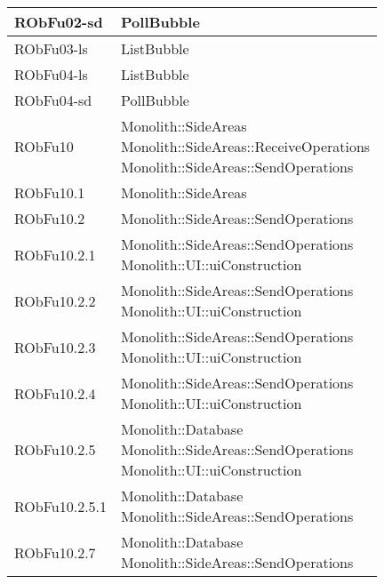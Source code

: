 \begin{center}
\begin{longtable}{|
*{1}{>{\centering\arraybackslash}m{2.5cm}|}
*{1}{>{\centering\arraybackslash}m{7.5cm}|}}
RObFu02-sd & \makecell[l]{PollBubble
\\}\\\hline
RObFu03-ls & \makecell[l]{ListBubble
\\}\\\hline
RObFu04-ls & \makecell[l]{ListBubble
\\}\\\hline
RObFu04-sd & \makecell[l]{PollBubble
\\}\\\hline
RObFu10 & \makecell[l]{Monolith::SideAreas
\\Monolith::SideAreas::ReceiveOperations
\\Monolith::SideAreas::SendOperations
\\}\\\hline
RObFu10.1 & \makecell[l]{Monolith::SideAreas
\\}\\\hline
RObFu10.2 & \makecell[l]{Monolith::SideAreas::SendOperations
\\}\\\hline
RObFu10.2.1 & \makecell[l]{Monolith::SideAreas::SendOperations
\\Monolith::UI::uiConstruction
\\}\\\hline
RObFu10.2.2 & \makecell[l]{Monolith::SideAreas::SendOperations
\\Monolith::UI::uiConstruction
\\}\\\hline
RObFu10.2.3 & \makecell[l]{Monolith::SideAreas::SendOperations
\\Monolith::UI::uiConstruction
\\}\\\hline
RObFu10.2.4 & \makecell[l]{Monolith::SideAreas::SendOperations
\\Monolith::UI::uiConstruction
\\}\\\hline
RObFu10.2.5 & \makecell[l]{Monolith::Database
\\Monolith::SideAreas::SendOperations
\\Monolith::UI::uiConstruction
\\}\\\hline
RObFu10.2.5.1 & \makecell[l]{Monolith::Database
\\Monolith::SideAreas::SendOperations
\\}\\\hline
RObFu10.2.7 & \makecell[l]{Monolith::Database
\\Monolith::SideAreas::SendOperations
}
\end{longtable}
\end{center}
